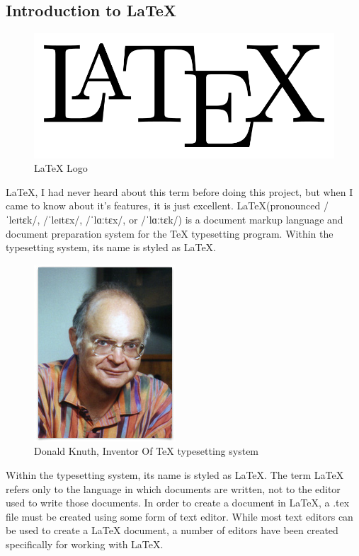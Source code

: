 \subsection{Introduction to \LaTeX}
\begin{figure}[ht]
\centering
\includegraphics[scale=0.2]{images/latex.png}
\caption{\LaTeX{} Logo}
\end{figure}
\hspace{-1.8em} \LaTeX{}, I had never heard about this term before doing this project,
but when I came to know about it's features, it is just excellent. 
\LaTeX (pronounced /ˈleɪtɛk/, /ˈleɪtɛx/, /ˈlɑːtɛx/, or /ˈlɑːtɛk/) is a 
document markup language and document preparation system for the \TeX{} 
typesetting  program. Within the typesetting system, its name is styled 
as \LaTeX.
\begin{figure}[ht]
\centering
\includegraphics[scale=0.4]{images/donald.jpg}
\caption{Donald Knuth, Inventor Of \TeX{} typesetting system}
\end{figure}

\hspace{-1.8em} Within the typesetting system, its name is styled as \LaTeX. The term 
\LaTeX{} refers only to the language in which documents are written, 
not to the editor used to write those documents. In order to create a 
document in \LaTeX, a .tex file must be created using some form of text 
editor. While most text editors can be used to create a \LaTeX{} document, 
a number of editors have been created specifically for working with \LaTeX.\\


